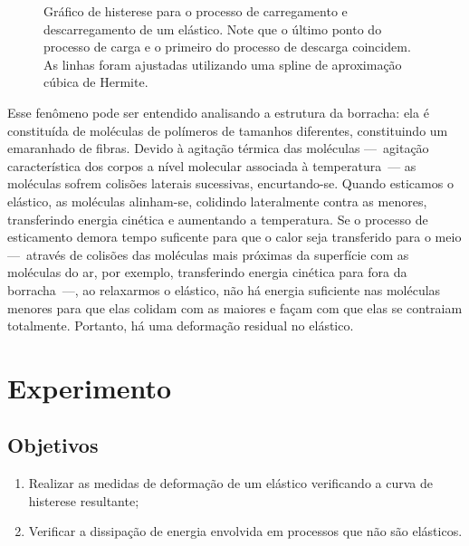 \begin{figure}[!h]\forcerectofloat
	\centering
	
	\caption{Gráfico de histerese para o processo de carregamento e descarregamento de um elástico. Note que o último ponto do processo de carga e o primeiro do processo de descarga coincidem. As linhas foram ajustadas utilizando uma spline de aproximação cúbica de Hermite.}
	\label{Fig:HistereseElast}
\end{figure}

Esse fenômeno pode ser entendido analisando a estrutura da borracha: ela é constituída de moléculas de polímeros de tamanhos diferentes, constituindo um emaranhado de fibras. Devido à agitação térmica das moléculas ---~agitação característica dos corpos a nível molecular associada à temperatura~--- as moléculas sofrem colisões laterais sucessivas, encurtando-se. Quando esticamos o elástico, as moléculas alinham-se, colidindo lateralmente contra as menores, transferindo energia cinética e aumentando a temperatura. Se o processo de esticamento demora tempo suficente para que o calor seja transferido para o meio ---~através de colisões das moléculas mais próximas da superfície com as moléculas do ar, por exemplo, transferindo energia cinética para fora da borracha~---, ao relaxarmos o elástico, não há energia suficiente nas moléculas menores para que elas colidam com as maiores e façam com que elas se contraiam totalmente. Portanto, há uma deformação residual no elástico.

\section{Experimento}

\subsection{Objetivos}
\label{Sec:ObjetivosElasticidade}

\begin{enumerate}
	\item Realizar as medidas de deformação de um elástico verificando a curva de histerese resultante;
	\item Verificar a dissipação de energia envolvida em processos que não são elásticos. 
\end{enumerate}

